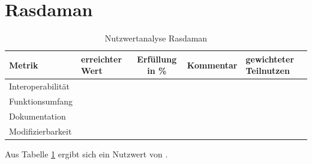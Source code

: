 

\section{Rasdaman}
\begin{table}[htp]
\centering
\small
\begin{tabular}{l|p{1.8cm}|c|p{3cm}|p{1.8cm}}
\textbf{Metrik} & \textbf{erreichter Wert} & \textbf{Erfüllung in \%} & \textbf{Kommentar} & \textbf{gewichteter Teilnutzen} \\ \hline
Interoperabilität &  &  &  &  \\ \hline
Funktionsumfang &  &  &  &  \\ \hline
Dokumentation &  &  &  &  \\ \hline
Modifizierbarkeit &  &  &  &  \\
\end{tabular}
\caption{Nutzwertanalyse Rasdaman}
\label{table:nutzwertanalyse-rasdaman}
\end{table}
Aus Tabelle \ref{table:nutzwertanalyse-rasdaman} ergibt sich ein Nutzwert von .




